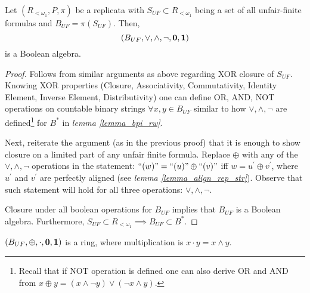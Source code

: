 \begin{corollary}\label{corollary_uf_ba}
  Let $(R_{<\omega_1}, P, \pi)$ be a replicata with $S_{UF} \subset R_{<\omega_1}$ being a set of all unfair-finite formulas and $B_{UF} = \pi(S_{UF})$. Then, 
  \[ (B_{UF}, \lor, \land, \neg, \bf{0}, \bf{1}) \]
  is a Boolean algebra.
\end{corollary}
\begin{proof}
  Follows from similar arguments as above regarding XOR closure of $S_{UF}$. Knowing XOR properties (Closure, Associativity, Commutativity, Identity Element, Inverse Element, Distributivity)  one can define OR, AND, NOT operations on countable binary strings $\forall x,y \in B_{UF}$ similar to how $\lor, \land, \neg$ are defined\footnote{Recall that if NOT operation is defined one can also derive OR and AND from $x \oplus y = (x \land \neg y) \lor (\neg x \land y)$.} for $B^{*}$ in \textit{lemma \ref{lemma_bpi_rw}}. 
  
  Next, reiterate the argument (as in the previous proof) that it is enough to show closure on a limited part of any unfair finite formula. Replace $\oplus$ with any of the $\lor, \land, \neg$ operations in the statement:  $\text{``} (w) \text{''}  = \text{``} (u) \text{''} \oplus \text{``} (v) \text{''}$ iff $w = u^{\prime} \oplus v^{\prime}$, where $u^{\prime}$ and $v^{\prime}$ are perfectly aligned (see \textit{lemma \ref{lemma_align_rep_str}}). Observe that such statement will hold for all three operations: $\lor, \land, \neg$.
  
  Closure under all boolean operations for $B_{UF}$ implies that $B_{UF}$ is a Boolean algebra. Furthermore, $S_{UF} \subset R_{<\omega_1} \implies B_{UF} \subset B^{*}$.
\end{proof}

\begin{corollary}
$ (B_{UF}, \oplus, \cdot, \bf{0}, \bf{1})$ is a ring, where multiplication is $x \cdot y = x \land y$.
\end{corollary}


